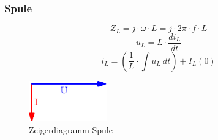\subsubsection{Spule}
\[ Z_L = j \cdot \omega \cdot L = j \cdot 2 \pi \cdot f \cdot L \]
\[ u_L = L \cdot \frac{di_L}{dt} \]
\[ i_L = \left( \frac{1}{L} \cdot \int u_L ~ dt \right) + I_L(0) \]
\begin{figure}[h!]
	\centering
	\includegraphics[width=0.3\textwidth]{zeig_ui_ind.pdf}
	\caption{Zeigerdiagramm Spule}
	\label{fig:zeig_ui_ind}
\end{figure}
